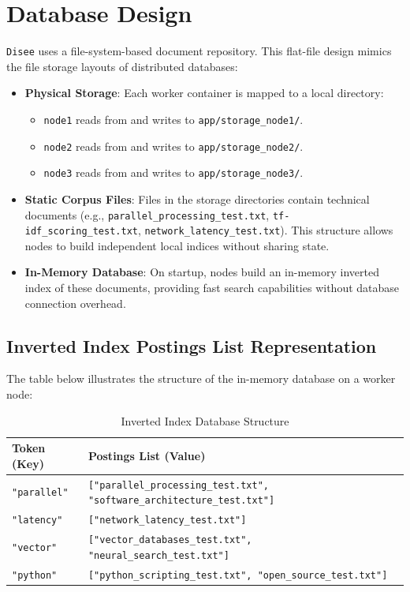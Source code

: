 \documentclass[11pt,a4paper]{article}
\begin{document}
\newpage

\section{Database Design}

\texttt{Disee} uses a file-system-based document repository. This flat-file design mimics the file storage layouts of distributed databases:

\begin{itemize}
    \item \textbf{Physical Storage}:
    Each worker container is mapped to a local directory:
    \begin{itemize}
        \item \texttt{node1} reads from and writes to \texttt{app/storage\_node1/}.
        \item \texttt{node2} reads from and writes to \texttt{app/storage\_node2/}.
        \item \texttt{node3} reads from and writes to \texttt{app/storage\_node3/}.
    \end{itemize}
    
    \item \textbf{Static Corpus Files}:
    Files in the storage directories contain technical documents (e.g., \texttt{parallel\_processing\_test.txt}, \texttt{tf-idf\_scoring\_test.txt}, \texttt{network\_latency\_test.txt}). This structure allows nodes to build independent local indices without sharing state.
    
    \item \textbf{In-Memory Database}:
    On startup, nodes build an in-memory inverted index of these documents, providing fast search capabilities without database connection overhead.
\end{itemize}

\subsection{Inverted Index Postings List Representation}
The table below illustrates the structure of the in-memory database on a worker node:

\begin{table}[h!]
\centering
\begin{tabular}{@{}ll@{}}
\toprule
\textbf{Token (Key)} & \textbf{Postings List (Value)} \\ \midrule
\texttt{"parallel"} & \texttt{["parallel\_processing\_test.txt", "software\_architecture\_test.txt"]} \\
\texttt{"latency"} & \texttt{["network\_latency\_test.txt"]} \\
\texttt{"vector"} & \texttt{["vector\_databases\_test.txt", "neural\_search\_test.txt"]} \\
\texttt{"python"} & \texttt{["python\_scripting\_test.txt", "open\_source\_test.txt"]} \\ \bottomrule
\end{tabular}
\caption{Inverted Index Database Structure}
\end{table}
\end{document}
